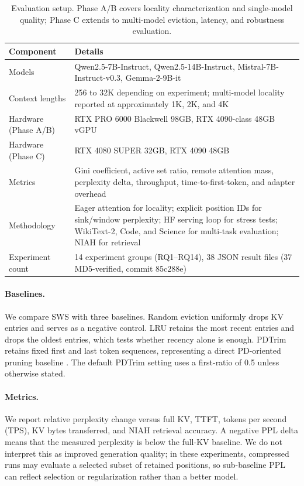 \documentclass[11pt]{article}
\newcommand{\method}{SWS}
\theoremstyle{definition}
\theoremstyle{plain}
\begin{document}
\begin{table}[t]
\centering
\caption{Evaluation setup.  Phase A/B covers locality characterization and single-model quality; Phase C extends to multi-model eviction, latency, and robustness evaluation.}
\label{tab:setup}
\small
\begin{tabularx}{\linewidth}{lY}
\toprule
Component & Details \\
\midrule
Models & Qwen2.5-7B-Instruct, Qwen2.5-14B-Instruct, Mistral-7B-Instruct-v0.3, Gemma-2-9B-it \\
Context lengths & 256 to 32K depending on experiment; multi-model locality reported at approximately 1K, 2K, and 4K \\
Hardware (Phase A/B) & RTX PRO 6000 Blackwell 98GB, RTX 4090-class 48GB vGPU \\
Hardware (Phase C) & RTX 4080 SUPER 32GB, RTX 4090 48GB \\
Metrics & Gini coefficient, active set ratio, remote attention mass, perplexity delta, throughput, time-to-first-token, and adapter overhead \\
Methodology & Eager attention for locality; explicit position IDs for sink/window perplexity; HF serving loop for stress tests; WikiText-2, Code, and Science for multi-task evaluation; NIAH for retrieval \\
Experiment count & 14 experiment groups (RQ1--RQ14), 38 JSON result files (37 MD5-verified, commit 85c288e) \\
\bottomrule
\end{tabularx}
\end{table}

\paragraph{Baselines.}
We compare \method{} with three baselines.  Random eviction uniformly drops KV entries and serves as a negative control.  LRU retains the most recent entries and drops the oldest entries, which tests whether recency alone is enough.  PDTrim retains fixed first and last token sequences, representing a direct PD-oriented pruning baseline \citep{pdtrim}.  The default PDTrim setting uses a first-ratio of 0.5 unless otherwise stated.

\paragraph{Metrics.}
We report relative perplexity change versus full KV, TTFT, tokens per second (TPS), KV bytes transferred, and NIAH retrieval accuracy.  A negative PPL delta means that the measured perplexity is below the full-KV baseline.  We do not interpret this as improved generation quality; in these experiments, compressed runs may evaluate a selected subset of retained positions, so sub-baseline PPL can reflect selection or regularization rather than a better model.
\end{document}
